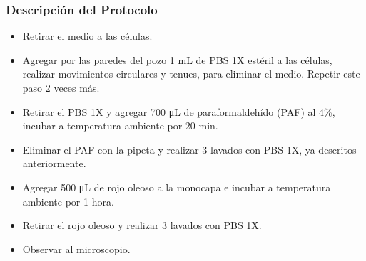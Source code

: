 \documentclass[
  spanish,
  12pt,
  a4paper,
]{article}
\providecommand{\tightlist}{%
  \setlength{\itemsep}{0pt}\setlength{\parskip}{0pt}}
\renewcommand*\contentsname{Tabla de contenidos}
\newcommand\contentsname{Tabla de contenidos}
\begin{document}


\pagestyle{fancy}
\renewcommand*\contentsname{Tabla de contenidos}
{
\setcounter{tocdepth}{3}
\tableofcontents
}

\newpage{}

\subsubsection{Descripción del
Protocolo}\label{descripciuxf3n-del-protocolo}

\begin{tcolorbox}[enhanced jigsaw, arc=.35mm, bottomrule=.15mm, bottomtitle=1mm, breakable, colback=white, colbacktitle=quarto-callout-note-color!10!white, colframe=quarto-callout-note-color-frame, coltitle=black, left=2mm, leftrule=.75mm, opacityback=0, opacitybacktitle=0.6, rightrule=.15mm, title=\textcolor{quarto-callout-note-color}{\faInfo}\hspace{0.5em}{Pasos}, titlerule=0mm, toprule=.15mm, toptitle=1mm]

\begin{itemize}
\tightlist
\item
  Retirar el medio a las células.
\item
  Agregar por las paredes del pozo 1 mL de PBS 1X estéril a las células,
  realizar movimientos circulares y tenues, para eliminar el medio.
  Repetir este paso 2 veces más.
\item
  Retirar el PBS 1X y agregar 700 μL de paraformaldehído (PAF) al 4\%,
  incubar a temperatura ambiente por 20 min.
\item
  Eliminar el PAF con la pipeta y realizar 3 lavados con PBS 1X, ya
  descritos anteriormente.
\item
  Agregar 500 μL de rojo oleoso a la monocapa e incubar a temperatura
  ambiente por 1 hora.
\item
  Retirar el rojo oleoso y realizar 3 lavados con PBS 1X.
\item
  Observar al microscopio.
\end{itemize}

\end{tcolorbox}
\end{document}
